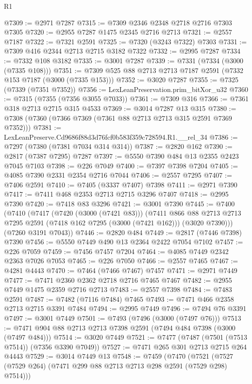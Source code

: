 \begin{lexlean}{R1}
\begin{coremodule}
@7309 := @2971 @7287
@7315 := @7309 @2346 @2348 @2718 @2716 @7303 @7305
@7320 := @2955 @7287 @1475 @2345 @2716 @2713
@7321 := @2557 @7187
@7322 := @7321 @2591
@7325 := @7320 (@3243 @7322) @7303
@7331 := @7309 @416 @2344 @2713 @2715 @3182 @7322
@7332 := @2995 @7287
@7334 := @7332 @108 @3182
@7335 := @3001 @7287
@7339 := @7331 (@7334 (@3000 (@7335 @108)))
@7351 := @7309 @525 @88 @2713 @2713 @7187 @2591 (@7332 @153 @7187 (@3000 (@7335 @153)))
@7352 := @3020 @7287
@7355 := @7325 (@7339 (@7351 @7352))
@7356 := LexLeanPreservation.prim_bitXor_u32
@7360 := @7315 (@7355 (@7356 @3055 @7033))
@7361 := @7309 @316
@7366 := @7361 @318 @2713 @2715 @315 @4533
@7369 := @3014 @7287 @13 @315
@7380 := @7308 (@7360 (@7366 @7369 (@7361 @88 @2713 @2713 @315 @2591 @7369 @7352)))
@7381 := LexLeanPreserve.Cd9686f88d3d76fcf0b583f359c728594.R1.__rel_34
@7386 := @7297 (@7380 (@7381 @7034 @314 @314))
@7387 := @2820 @162
@7390 := @2817 (@7387 @7295) @7287
@7397 := @5550 @7390 @484 @13 @2355 @2423 @7045 @7103
@7398 := @226 @7049
@7400 := @7397 @7398 @7204
@7405 := @4085 @7390 @2331 @2354 @2716 @7044
@7406 := @2557 @7295
@7407 := @7406 @2591
@7410 := @7405 (@3337 @7407) @7398
@7411 := @2971 @7390
@7417 := @7411 @468 @2353 @2713 @2715 @3296 @7407
@7418 := @2995 @7390
@7420 := @7418 @83 @3296
@7421 := @3001 @7390
@7445 := @7400
    (@7410
      (@7417
        (@7420 (@3000 (@7421 @83)))
        (@7411
          @866
          @88
          @2713
          @2713
          @7295
          @2591
          (@7418 @162 @7295 (@3000 (@7421 @162)))
          (@3020 @7390)))
      (@7260 @3191 @7043))
@7446 := @2820 @484
@7449 := @2817 (@7446 @7398) @7390
@7456 := @5550 @7449 @490 @13 @2364 @2422 @7054 @7102
@7457 := @226 @7059
@7459 := @7456 @7457 @7204
@7464 := @4085 @7449 @2342 @2363 @7026 @7053
@7465 := @226 @7050
@7466 := @2557 @7465
@7467 := @4281 @4443
@7470 := @7464 (@7466 @7467) @7457
@7471 := @2971 @7449
@7477 := @7471 @2360 @2362 @2718 @2716 @7465 @7467
@7482 := @2955 @7449 @1475 @2359 @2716 @2713
@7483 := @2557 @7398
@7484 := @7483 @2591
@7487 := @7482 (@7116 @7484) @7465
@7493 := @7471 @466 @2358 @2713 @2715 @3391 @7484
@7494 := @2995 @7449
@7496 := @7494 @76 @3391
@7497 := @3001 @7449
@7501 := @7493 (@7496 (@3000 (@7497 @76)))
@7513 := @7471 @904 @88 @2713 @2713 @7398 @2591 (@7494 @484 @7398 (@3000 (@7497 @484)))
@7514 := @3020 @7449
@7521 := @7477 (@7487 (@7501 (@7513 @7514)) (@7356 @3390 @7049))
@7527 := @7471 @265 @301 @2713 @2715 @264 @4443
@7529 := @3014 @7449 @13
@7548 := @7459
    (@7470
      (@7521 (@7527 (@7529 @264) (@7471 @299 @88 @2713 @2713 @298 @2591 (@7529 @298) @7514)))

\end{coremodule}
\end{lexlean}
